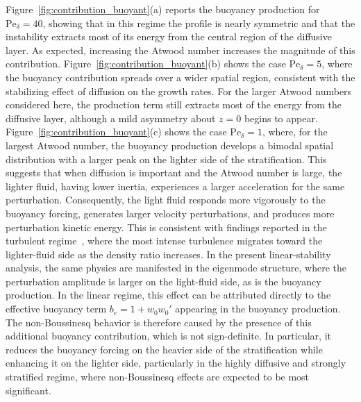 \documentclass[11pt]{article}
\newcommand{\Pe}{\mathrm{Pe}}
\begin{document}
Figure~\ref{fig:contribution_buoyant}(a) reports the buoyancy production for \(\Pe_{\delta} = 40\), showing that in this regime the profile is nearly symmetric and that the instability extracts most of its energy from the central region of the diffusive layer. As expected, increasing the Atwood number increases the magnitude of this contribution. Figure~\ref{fig:contribution_buoyant}(b) shows the case \(\Pe_{\delta} = 5\), where the buoyancy contribution spreads over a wider spatial region, consistent with the stabilizing effect of diffusion on the growth rates. For the larger Atwood numbers considered here, the production term still extracts most of the energy from the diffusive layer, although a mild asymmetry about \(z=0\) begins to appear. Figure~\ref{fig:contribution_buoyant}(c) shows the case \(\Pe_{\delta} = 1\), where, for the largest Atwood number, the buoyancy production develops a bimodal spatial distribution with a larger peak on the lighter side of the stratification. This suggests that when diffusion is important and the Atwood number is large, the lighter fluid, having lower inertia, experiences a larger acceleration for the same perturbation. Consequently, the light fluid responds more vigorously to the buoyancy forcing, generates larger velocity perturbations, and produces more perturbation kinetic energy. This is consistent with findings reported in the turbulent regime~\citep{livescu-ristorcelli-2008,baltzer-livescu-2020}, where the most intense turbulence migrates toward the lighter-fluid side as the density ratio increases. In the present linear-stability analysis, the same physics are manifested in the eigenmode structure, where the perturbation amplitude is larger on the light-fluid side, as is the buoyancy production. In the linear regime, this effect can be attributed directly to the effective buoyancy term \(b_e = 1 + w_0 w_0'\) appearing in the buoyancy production. The non-Boussinesq behavior is therefore caused by the presence of this additional buoyancy contribution, which is not sign-definite. In particular, it reduces the buoyancy forcing on the heavier side of the stratification while enhancing it on the lighter side, particularly in the highly diffusive and strongly stratified regime, where non-Boussinesq effects are expected to be most significant.
\end{document}
